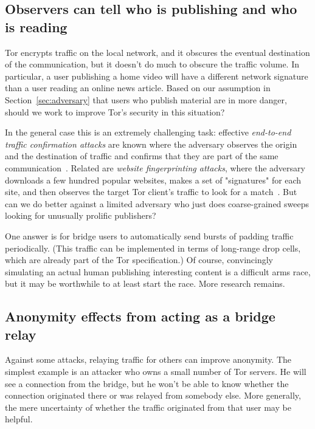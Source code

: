 \documentclass{llncs}
\begin{document}

\subsection{Observers can tell who is publishing and who is reading}
\label{subsec:upload-padding}

Tor encrypts traffic on the local network, and it obscures the eventual
destination of the communication, but it doesn't do much to obscure the
traffic volume. In particular, a user publishing a home video will have a
different network signature than a user reading an online news article.
Based on our assumption in Section~\ref{sec:adversary} that users who
publish material are in more danger, should we work to improve Tor's
security in this situation?

In the general case this is an extremely challenging task:
effective \emph{end-to-end traffic confirmation attacks}
are known where the adversary observes the origin and the
destination of traffic and confirms that they are part of the
same communication~\cite{danezis:pet2004,e2e-traffic}. Related are
\emph{website fingerprinting attacks}, where the adversary downloads
a few hundred popular websites, makes a set of "signatures" for each
site, and then observes the target Tor client's traffic to look for
a match~\cite{pet05-bissias,defensive-dropping}. But can we do better
against a limited adversary who just does coarse-grained sweeps looking
for unusually prolific publishers?

One answer is for bridge users to automatically send bursts of padding
traffic periodically. (This traffic can be implemented in terms of
long-range drop cells, which are already part of the Tor specification.)
Of course, convincingly simulating an actual human publishing interesting
content is a difficult arms race, but it may be worthwhile to at least
start the race. More research remains.

\subsection{Anonymity effects from acting as a bridge relay}

Against some attacks, relaying traffic for others can improve
anonymity. The simplest example is an attacker who owns a small number
of Tor servers. He will see a connection from the bridge, but he won't
be able to know whether the connection originated there or was relayed
from somebody else. More generally, the mere uncertainty of whether the
traffic originated from that user may be helpful.
\end{document}
